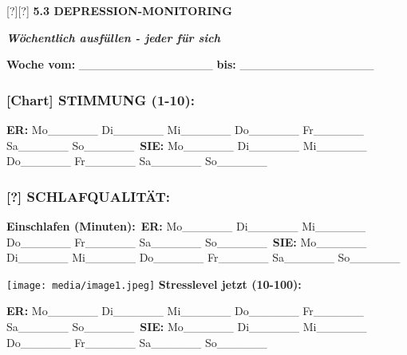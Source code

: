 [?][?] \textbf{5.3 DEPRESSION-MONITORING}

\emph{\textbf{Wöchentlich ausfüllen - jeder für sich}}

\textbf{Woche vom:} \_\_\_\_\_\_\_\_\_\_\_\_\_\_\_\_ \textbf{bis:} \_\_\_\_\_\_\_\_\_\_\_\_\_\_\_\_

\hypertarget{section-6}{%
\subsubsection{}\label{section-6}}

\hypertarget{stimmung-1-10}{%
\subsubsection{\texorpdfstring{\textbf{[Chart] STIMMUNG (1-10):}}{[Chart] STIMMUNG (1-10):}}\label{stimmung-1-10}}

\textbf{ER:} Mo\_\_\_\_\_\_ Di\_\_\_\_\_\_ Mi\_\_\_\_\_\_ Do\_\_\_\_\_\_ Fr\_\_\_\_\_\_ Sa\_\_\_\_\_\_ So\_\_\_\_\_\_\
\textbf{SIE:} Mo\_\_\_\_\_\_ Di\_\_\_\_\_\_ Mi\_\_\_\_\_\_ Do\_\_\_\_\_\_ Fr\_\_\_\_\_\_ Sa\_\_\_\_\_\_ So\_\_\_\_\_\_

\hypertarget{section-7}{%
\subsubsection{}\label{section-7}}

\hypertarget{schlafqualituxe4t-1}{%
\subsubsection{\texorpdfstring{\textbf{[?] SCHLAFQUALITÄT:}}{[?] SCHLAFQUALITÄT:}}\label{schlafqualituxe4t-1}}

\textbf{Einschlafen (Minuten):}\
\textbf{ER:} Mo\_\_\_\_\_\_ Di\_\_\_\_\_\_ Mi\_\_\_\_\_\_ Do\_\_\_\_\_\_ Fr\_\_\_\_\_\_ Sa\_\_\_\_\_\_ So\_\_\_\_\_\_\
\textbf{SIE:} Mo\_\_\_\_\_\_ Di\_\_\_\_\_\_ Mi\_\_\_\_\_\_ Do\_\_\_\_\_\_ Fr\_\_\_\_\_\_ Sa\_\_\_\_\_\_ So\_\_\_\_\_\_

\texttt{[image: media/image1.jpeg]} \textbf{Stresslevel jetzt (10-100):}

\textbf{ER:} Mo\_\_\_\_\_\_ Di\_\_\_\_\_\_ Mi\_\_\_\_\_\_ Do\_\_\_\_\_\_ Fr\_\_\_\_\_\_ Sa\_\_\_\_\_\_ So\_\_\_\_\_\_\
\textbf{SIE:} Mo\_\_\_\_\_\_ Di\_\_\_\_\_\_ Mi\_\_\_\_\_\_ Do\_\_\_\_\_\_ Fr\_\_\_\_\_\_ Sa\_\_\_\_\_\_ So\_\_\_\_\_\_

\hypertarget{section-8}{%
\subsubsection{}\label{section-8}}

